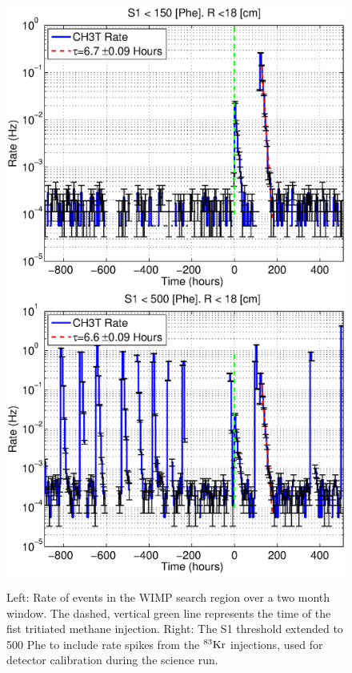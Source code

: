 \begin{figure}[H]\centering
\includegraphics[scale=0.25]
{CH3T_Rate_fid_150_lux10_20130813T1120_note.eps}
\includegraphics[scale=0.25]{CH3T_Rate_fid_500_lux10_20130813T1120.eps}
\caption{Left: Rate of events in the WIMP search region over a two month window. The dashed, vertical green line represents the time of the fist tritiated methane injection. Right: The S1 threshold extended to 500 Phe to include rate spikes from the $\rm ^{83}Kr$ injections, used for detector calibration during the science run. }
\label{fig:Removal}
\end{figure}



